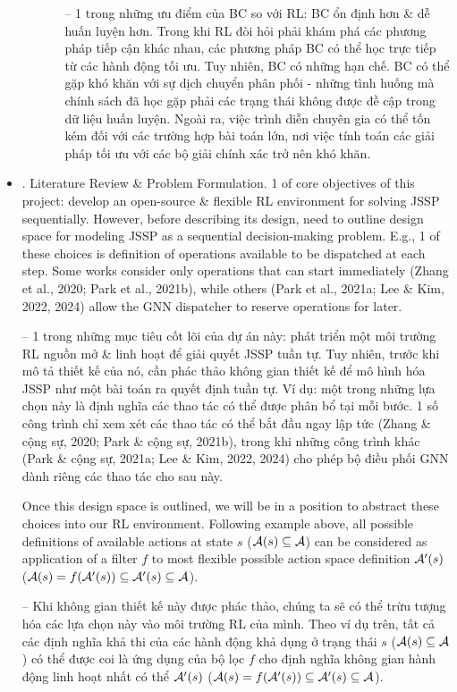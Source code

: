 \documentclass{article}
\begin{document}
\begin{itemize}
\begin{itemize}
\begin{itemize}
            -- 1 trong những ưu điểm của BC so với RL: BC ổn định hơn \& dễ huấn luyện hơn. Trong khi RL đòi hỏi phải khám phá các phương pháp tiếp cận khác nhau, các phương pháp BC có thể học trực tiếp từ các hành động tối ưu. Tuy nhiên, BC có những hạn chế. BC có thể gặp khó khăn với sự dịch chuyển phân phối - những tình huống mà chính sách đã học gặp phải các trạng thái không được đề cập trong dữ liệu huấn luyện. Ngoài ra, việc trình diễn chuyên gia có thể tốn kém đối với các trường hợp bài toán lớn, nơi việc tính toán các giải pháp tối ưu với các bộ giải chính xác trở nên khó khăn.
        \end{itemize}
    \end{itemize}
    \item {. Literature Review \& Problem Formulation.} 1 of core objectives of this project: develop an open-source \& flexible RL environment for solving JSSP sequentially. However, before describing its design, need to outline design space for modeling JSSP as a sequential decision-making problem. E.g., 1 of these choices is definition of operations available to be dispatched at each step. Some works consider only operations that can start immediately (Zhang et al., 2020; Park et al., 2021b), while others (Park et al., 2021a; Lee \& Kim, 2022, 2024) allow the GNN dispatcher to reserve operations for later.

    -- 1 trong những mục tiêu cốt lõi của dự án này: phát triển một môi trường RL nguồn mở \& linh hoạt để giải quyết JSSP tuần tự. Tuy nhiên, trước khi mô tả thiết kế của nó, cần phác thảo không gian thiết kế để mô hình hóa JSSP như một bài toán ra quyết định tuần tự. Ví dụ: một trong những lựa chọn này là định nghĩa các thao tác có thể được phân bổ tại mỗi bước. 1 số công trình chỉ xem xét các thao tác có thể bắt đầu ngay lập tức (Zhang \& cộng sự, 2020; Park \& cộng sự, 2021b), trong khi những công trình khác (Park \& cộng sự, 2021a; Lee \& Kim, 2022, 2024) cho phép bộ điều phối GNN dành riêng các thao tác cho sau này.

    Once this design space is outlined, we will be in a position to abstract these choices into our RL environment. Following example above, all possible definitions of available actions at state $s$ (${\cal A}(s)\subseteq{\cal A}$) can be considered as application of a filter $f$ to most flexible possible action space definition ${\cal A}'(s)$ (${\cal A}(s) = f({\cal A}'(s))\subseteq{\cal A}'(s)\subseteq{\cal A}$).

    -- Khi không gian thiết kế này được phác thảo, chúng ta sẽ có thể trừu tượng hóa các lựa chọn này vào môi trường RL của mình. Theo ví dụ trên, tất cả các định nghĩa khả thi của các hành động khả dụng ở trạng thái $s$ (${\cal A}(s)\subseteq{\cal A}$) có thể được coi là ứng dụng của bộ lọc $f$ cho định nghĩa không gian hành động linh hoạt nhất có thể ${\cal A}'(s)$ (${\cal A}(s) = f({\cal A}'(s))\subseteq{\cal A}'(s)\subseteq{\cal A}$).


\end{itemize}
\end{document}
